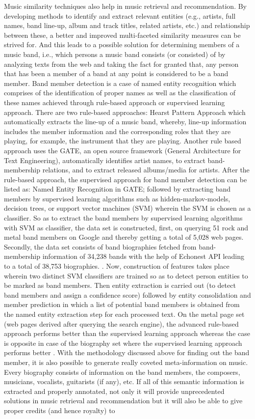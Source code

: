 \documentclass{proc}
\begin{document}
Music similarity techniques also help in music retrieval and recommendation. By developing methods to identify and extract relevant entities (e.g., artists, full names, band line-up, album and track titles, related artists, etc.) and relationship between these, a better and improved multi-faceted similarity measures can be strived for. And this leads to a possible solution for determining members of a music band, i.e., which persons a music band consists (or consisted) of by analyzing texts from the web and taking the fact for granted that, any person that has been a member of a band at any point is considered to be a band member. Band member detection is a case of named entity recognition which comprises of the identification of proper names as well as the classification of these names achieved through rule-based approach or supervised learning approach. There are two rule-based approaches: Hearst Pattern Approach which automatically extracts the line-up of a music band, whereby, line-up information includes the member information and the corresponding roles that they are playing, for example, the instrument that they are playing. Another rule based approach uses the GATE, an open source framework (General Architecture for Text Engineering), automatically identifies artist names, to extract band-membership relations, and to extract released albums/media for artists. After the rule-based approach, the supervised approach for band member detection  can be listed as: Named Entity Recognition in GATE; followed by extracting band members by supervised learning algorithms such as hidden-markov-models, decision trees, or support vector machines (SVM) wherein the SVM is chosen as a classifier. So as to extract the band members by supervised learning algorithms with SVM as classifier, the data set is constructed, first, on querying 51 rock and metal band members on Google and thereby getting a total of 5,028 web pages. Secondly, the data set consists of band biographies fetched from band-membership information of 34,238 bands with the help of Echonest API leading to a total of 38,753 biographies. . Now, construction of features takes place wherein two distinct SVM classifiers are trained so as to detect person entities to be marked as band members.  Then entity extraction is carried out (to detect band members and assign a confidence score) followed by entity consolidation and member prediction in which a list of potential band members is obtained from the named entity extraction step for each processed text. On the metal page set (web pages derived after querying the search engine), the advanced rule-based approach performs better than the supervised learning approach whereas the case is opposite in case of the biography set where the supervised learning approach performs better \cite{Knees}. With the methodology discussed above for finding out the band member, it is also possible to generate really coveted meta-information on music. Every biography consists of information on the band members, the composers, musicians, vocalists, guitarists (if any), etc. If all of this semantic information is extracted and properly annotated, not only it will provide unprecedented solutions in music retrieval and recommendation but it will also be able to give proper credits (and hence royalty) to 
\end{document}
